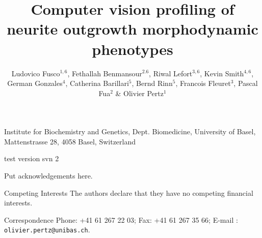 \documentclass{nature}
\title{Computer vision profiling of neurite outgrowth morphodynamic phenotypes}
\author{Ludovico Fusco$^{1,6}$, Fethallah Benmansour$^{2. 6}$, Riwal Lefort$^{3, 6}$, Kevin Smith$^{4, 6}$, German Gonzales$^4$,  Catherina Barillari$^5$, Bernd Rinn$^5$, Francois Fleuret$^3$, Pascal Fua$^2$  \& Olivier Pertz$^1$}
\begin{document}
\maketitle

\begin{affiliations}
 \item Institute for Biochemistry and Genetics, Dept. Biomedicine, University of Basel, Mattenstrasse 28, 4058 Basel, Switzerland
 \item 
 \item 
 \item 
 \item 
 \item 
\end{affiliations}



test version svn 2


\begin{results}







\end{results}




%
%


\begin{addendum}
 \item Put acknowledgements here.
 \item[Competing Interests] The authors declare that they have no
competing financial interests.
 \item[Correspondence] Phone: +41 61 267 22 03; Fax: +41 61 267 35 66; E-mail : \texttt{olivier.pertz@unibas.ch}.
\end{addendum}

\end{document}
